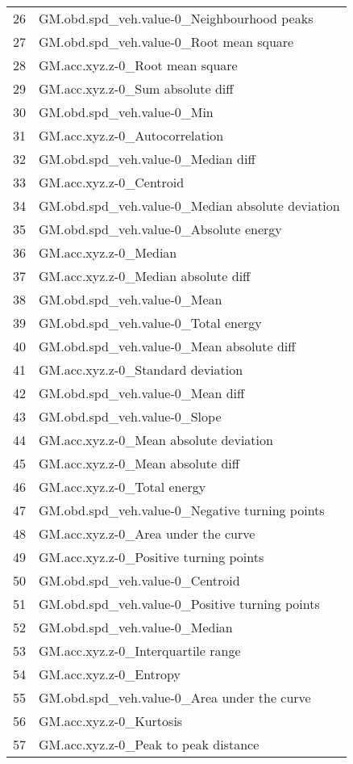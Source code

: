 \begin{tabular}{ll}
26 &        GM.obd.spd\_veh.value-0\_Neighbourhood peaks \\
27 &           GM.obd.spd\_veh.value-0\_Root mean square \\
28 &                   GM.acc.xyz.z-0\_Root mean square \\
29 &                  GM.acc.xyz.z-0\_Sum absolute diff \\
30 &                        GM.obd.spd\_veh.value-0\_Min \\
31 &                    GM.acc.xyz.z-0\_Autocorrelation \\
32 &                GM.obd.spd\_veh.value-0\_Median diff \\
33 &                           GM.acc.xyz.z-0\_Centroid \\
34 &  GM.obd.spd\_veh.value-0\_Median absolute deviation \\
35 &            GM.obd.spd\_veh.value-0\_Absolute energy \\
36 &                             GM.acc.xyz.z-0\_Median \\
37 &               GM.acc.xyz.z-0\_Median absolute diff \\
38 &                       GM.obd.spd\_veh.value-0\_Mean \\
39 &               GM.obd.spd\_veh.value-0\_Total energy \\
40 &         GM.obd.spd\_veh.value-0\_Mean absolute diff \\
41 &                 GM.acc.xyz.z-0\_Standard deviation \\
42 &                  GM.obd.spd\_veh.value-0\_Mean diff \\
43 &                      GM.obd.spd\_veh.value-0\_Slope \\
44 &            GM.acc.xyz.z-0\_Mean absolute deviation \\
45 &                 GM.acc.xyz.z-0\_Mean absolute diff \\
46 &                       GM.acc.xyz.z-0\_Total energy \\
47 &    GM.obd.spd\_veh.value-0\_Negative turning points \\
48 &               GM.acc.xyz.z-0\_Area under the curve \\
49 &            GM.acc.xyz.z-0\_Positive turning points \\
50 &                   GM.obd.spd\_veh.value-0\_Centroid \\
51 &    GM.obd.spd\_veh.value-0\_Positive turning points \\
52 &                     GM.obd.spd\_veh.value-0\_Median \\
53 &                GM.acc.xyz.z-0\_Interquartile range \\
54 &                            GM.acc.xyz.z-0\_Entropy \\
55 &       GM.obd.spd\_veh.value-0\_Area under the curve \\
56 &                           GM.acc.xyz.z-0\_Kurtosis \\
57 &              GM.acc.xyz.z-0\_Peak to peak distance \\
\bottomrule
\end{tabular}

